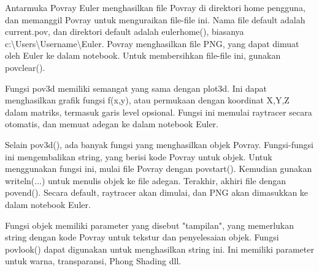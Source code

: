 \documentclass{article}
\begin{document}
\begin{eulernotebook}
\begin{eulercomment}
\begin{eulercomment}
\begin{eulercomment}
\begin{eulercomment}
\begin{eulercomment}
\begin{eulercomment}
\begin{eulercomment}
\begin{eulercomment}
\begin{eulercomment}
\begin{eulercomment}
\begin{eulercomment}
\begin{eulercomment}
\begin{eulercomment}
\begin{eulercomment}
\begin{eulercomment}
\begin{eulercomment}
\begin{eulercomment}
Antarmuka Povray Euler menghasilkan file Povray di direktori home
pengguna, dan memanggil Povray untuk menguraikan file-file ini. Nama
file default adalah current.pov, dan direktori default adalah
eulerhome(), biasanya c:\textbackslash{}Users\textbackslash{}Username\textbackslash{}Euler. Povray menghasilkan
file PNG, yang dapat dimuat oleh Euler ke dalam notebook. Untuk
membersihkan file-file ini, gunakan povclear().

Fungsi pov3d memiliki semangat yang sama dengan plot3d. Ini dapat
menghasilkan grafik fungsi f(x,y), atau permukaan dengan koordinat
X,Y,Z dalam matriks, termasuk garis level opsional. Fungsi ini memulai
raytracer secara otomatis, dan memuat adegan ke dalam notebook Euler.

Selain pov3d(), ada banyak fungsi yang menghasilkan objek Povray.
Fungsi-fungsi ini mengembalikan string, yang berisi kode Povray untuk
objek. Untuk menggunakan fungsi ini, mulai file Povray dengan
povstart(). Kemudian gunakan writeln(...) untuk menulis objek ke file
adegan. Terakhir, akhiri file dengan povend(). Secara default,
raytracer akan dimulai, dan PNG akan dimasukkan ke dalam notebook
Euler.

Fungsi objek memiliki parameter yang disebut "tampilan", yang
memerlukan string dengan kode Povray untuk tekstur dan penyelesaian
objek. Fungsi povlook() dapat digunakan untuk menghasilkan string ini.
Ini memiliki parameter untuk warna, transparansi, Phong Shading dll.


\end{eulercomment}
\end{eulercomment}
\end{eulercomment}
\end{eulercomment}
\end{eulercomment}
\end{eulercomment}
\end{eulercomment}
\end{eulercomment}
\end{eulercomment}
\end{eulercomment}
\end{eulercomment}
\end{eulercomment}
\end{eulercomment}
\end{eulercomment}
\end{eulercomment}
\end{eulercomment}
\end{eulercomment}
\end{eulernotebook}
\end{document}
